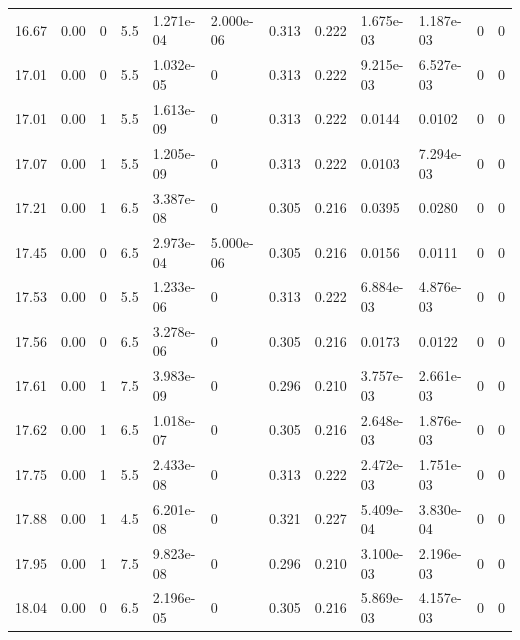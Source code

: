 \documentclass[preview]{standalone}
\begin{document}
{{{{{\begin{tabular}{L{1.2cm}C{1.2cm} C{0.3cm}C{0.5cm} C{1.4cm}C{1.4cm} C{1.4cm}C{1.4cm} C{1.6cm}C{1.6cm} C{1.6cm}C{1.6cm}}
  16.67  &  0.00  & 0     & 5.5 &  1.271e-04  & 2.000e-06  &  0.313&   0.222& 1.675e-03 & 1.187e-03   &  0 & 0  \\ 
  17.01  &  0.00  & 0     & 5.5 &  1.032e-05  & 0  &  0.313&   0.222& 9.215e-03 & 6.527e-03   &  0 & 0  \\ 
  17.01  &  0.00  & 1     & 5.5 &  1.613e-09  & 0  &  0.313&   0.222& 0.0144 & 0.0102   &  0 & 0  \\ 
  17.07  &  0.00  & 1     & 5.5 &  1.205e-09  & 0  &  0.313&   0.222& 0.0103 & 7.294e-03   &  0 & 0  \\ 
  17.21  &  0.00  & 1     & 6.5 &  3.387e-08  & 0  &  0.305&   0.216& 0.0395 & 0.0280   &  0 & 0  \\ 
  17.45  &  0.00  & 0     & 6.5 &  2.973e-04  & 5.000e-06  &  0.305&   0.216& 0.0156 & 0.0111   &  0 & 0  \\ 
  17.53  &  0.00  & 0     & 5.5 &  1.233e-06  & 0  &  0.313&   0.222& 6.884e-03 & 4.876e-03   &  0 & 0  \\ 
  17.56  &  0.00  & 0     & 6.5 &  3.278e-06  & 0  &  0.305&   0.216& 0.0173 & 0.0122   &  0 & 0  \\ 
  17.61  &  0.00  & 1     & 7.5 &  3.983e-09  & 0  &  0.296&   0.210& 3.757e-03 & 2.661e-03   &  0 & 0  \\ 
  17.62  &  0.00  & 1     & 6.5 &  1.018e-07  & 0  &  0.305&   0.216& 2.648e-03 & 1.876e-03   &  0 & 0  \\ 
  17.75  &  0.00  & 1     & 5.5 &  2.433e-08  & 0  &  0.313&   0.222& 2.472e-03 & 1.751e-03   &  0 & 0  \\ 
  17.88  &  0.00  & 1     & 4.5 &  6.201e-08  & 0  &  0.321&   0.227& 5.409e-04 & 3.830e-04   &  0 & 0  \\ 
  17.95  &  0.00  & 1     & 7.5 &  9.823e-08  & 0  &  0.296&   0.210& 3.100e-03 & 2.196e-03   &  0 & 0  \\ 
  18.04  &  0.00  & 0     & 6.5 &  2.196e-05  & 0  &  0.305&   0.216& 5.869e-03 & 4.157e-03   &  0 & 0  \\ 
\hline 
\end{tabular} 

}}}}}
\end{document}
